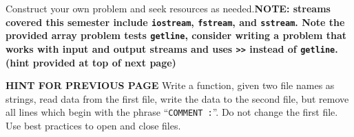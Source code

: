 \documentclass[addpoints,12pt]{exam}
\newcommand{\Soln}[1]{{\color{red}{SOLUTION: #1}}}%
\newcommand{\SolnNo}{\Soln{No solutions provided for this sample, it is up to you to verify your understanding of the topic using the resources that are available to you. Ask your peers, use office hours, use \hyperlink{https://edstem.org/us/courses/72170/discussion}{EdStem}.}}
\begin{document}
\begin{questions}
    \newpage

 Construct your own problem and seek resources as needed.\textbf{NOTE: streams covered this semester include \texttt{iostream}, \texttt{fstream}, and \texttt{sstream}. Note the provided array problem tests \texttt{getline}, consider writing a problem that works with input and output streams and uses \texttt{>>} instead of \texttt{getline}. \\
(hint provided at top of next page)}
    \newpage

\textbf{HINT FOR PREVIOUS PAGE} Write a function, given two file names as strings, read data from the first file, write the data to the second file, but remove all lines which begin with the phrase ``\texttt{COMMENT :}''. Do not change the first file. Use best practices to open and close files.
\end{questions}
\end{document}
